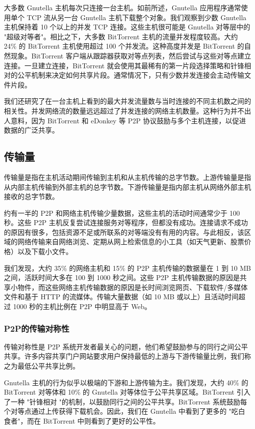 大多数 Gnutella 主机每次只连接一台主机。如前所述，Gnutella 应用程序通常使用单个 TCP 流从另一台 Gnutella 主机下载整个对象。我们观察到少数 Gnutella 主机保持着 10 个以上的并发 TCP 连接。这些主机很可能是 Gnutella 对等层中的 "超级对等者"。相比之下，大多数 BitTorrent 主机的流量并发程度较高。大约 24\% 的 BitTorrent 主机使用超过 100 个并发流。这种高度并发是 BitTorrent 的自然现象。BitTorrent 客户端从跟踪器获取对等点列表，然后尝试与这些对等点建立连接。一旦建立连接，BitTorrent 就会使用其最稀有的第一片段选择策略和针锋相对的公平机制来决定如何共享片段。通常情况下，只有少数并发连接会主动传输文件片段。

我们还研究了在一台主机上看到的最大并发流量数与当时连接的不同主机数之间的相关性。并发网络流的数量远远超过了并发连接的网络主机数量。这种行为并不出人意料，因为 BitTorrent 和 eDonkey 等 P2P 协议鼓励与多个主机连接，以促进数据的广泛共享。

\subsection{传输量}

传输量是指在主机活动期间传输到主机和从主机传输的总字节数。上游传输量是指从内部主机传输到外部主机的总字节数。下游传输量是指内部主机从网络外部主机接收的总字节数。

约有一半的 P2P 和网络主机传输少量数据，这些主机的活动时间通常少于 100 秒。这些 P2P 主机反复尝试连接服务对等程序，但都没有成功。连接请求不成功的原因有很多，包括资源不足或所联系的对等端没有有用的内容。与此相反，该区域的网络传输来自网络浏览、定期从网上检索信息的小工具（如天气更新、股票价格）以及下载小文件。

我们发现，大约 35\% 的网络主机和 15\% 的 P2P 主机传输的数据量在 1 到 10 MB 之间，活跃时间大多在 100 到 1000 秒之间。这些 P2P 主机传输数据的原因是共享小物件，而这些网络主机传输数据的原因是长时间浏览网页、下载软件/多媒体文件和基于 HTTP 的流媒体。传输大量数据（如 10 MB 或以上）且活动时间超过 1000 秒的主机比例在 P2P 中明显高于 Web。

\subsubsection{P2P的传输对称性}

传输对称性是 P2P 系统开发者最关心的问题，他们希望鼓励参与的同行之间公平共享。许多内容共享门户网站要求用户保持最低的上游与下游传输量比例，我们称之为最低公平共享比例。

Gnutella 主机的行为似乎以极端的下游和上游传输为主。我们发现，大约 40\% 的 BitTorrent 对等体和 10\% 的 Gnutella 对等体位于公平共享区域。BitTorrent 引入了一种 "针锋相对 "的机制，以鼓励同行之间的公平共享。BitTorrent 系统鼓励每个对等点通过上传获得下载机会。因此，我们在 Gnutella 中看到了更多的 "吃白食者"，而在 BitTorrent 中则看到了更好的公平性。


